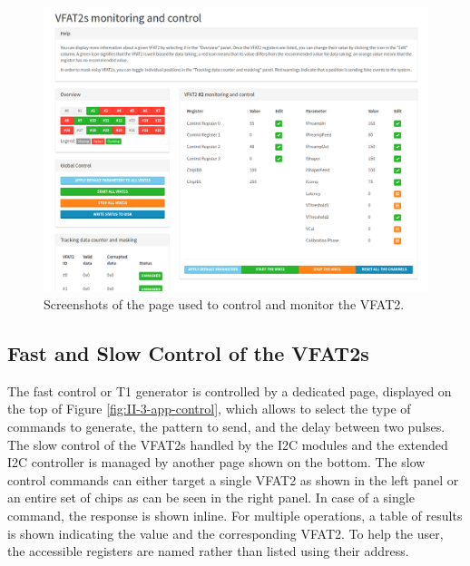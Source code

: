       \begin{figure}[h!]
        \centering
        \includegraphics[width=\textwidth]{img/II-3-test-beam/app-vfat2.png}
        \caption{Screenshots of the page used to control and monitor the VFAT2.}
        \label{fig:II-3-app-vfat2}
      \end{figure}

    \subsection{Fast and Slow Control of the VFAT2s}

      The fast control or T1 generator is controlled by a dedicated page, displayed on the top of Figure \ref{fig:II-3-app-control}, which allows to select the type of commands to generate, the pattern to send, and the delay between two pulses. The slow control of the VFAT2s handled by the I2C modules and the extended I2C controller is managed by another page shown on the bottom. The slow control commands can either target a single VFAT2 as shown in the left panel or an entire set of chips as can be seen in the right panel. In case of a single command, the response is shown inline. For multiple operations, a table of results is shown indicating the value and the corresponding VFAT2. To help the user, the accessible registers are named rather than listed using their address.

